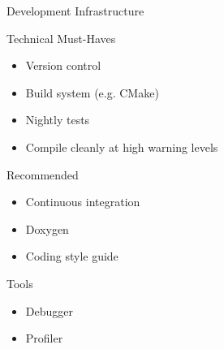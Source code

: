 

\begin{frame}[fragile]{Development Infrastructure}

 \begin{block}{Technical Must-Haves}
  \begin{itemize}
   \item Version control
   \item Build system (e.g. CMake)
   \item Nightly tests
   \item Compile cleanly at high warning levels
  \end{itemize}
 \end{block}

 \begin{block}{Recommended}
  \begin{itemize}
   \item Continuous integration
   \item Doxygen
   \item Coding style guide
  \end{itemize}
 \end{block}
 
 \begin{block}{Tools}
  \begin{itemize}
   \item Debugger
   \item Profiler
  \end{itemize}
 \end{block}
 
\end{frame}

